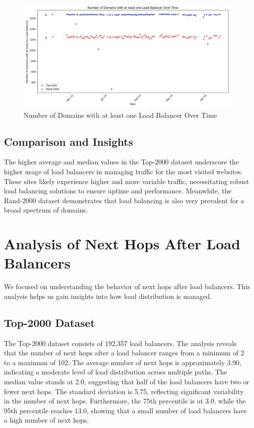 \documentclass[12pt]{cwru_thesis}
\begin{document}
\begin{figure}[h]
    \centering
    \includegraphics[width=\textwidth]{figures/scatter_plot_domains.png}
    \caption{Number of Domains with at least one Load Balancer Over Time}
    \label{fig:scatter_plot_domains}
\end{figure}
\subsection{Comparison and Insights}


The higher average and median values in the Top-2000 dataset underscore the higher usage of load balancers in managing traffic for the most visited websites. These sites likely experience higher and more variable traffic, necessitating robust load balancing solutions to ensure uptime and performance. Meanwhile, the Rand-2000 dataset demonstrates that load balancing is also very prevalent for a broad spectrum of domains.





\section{Analysis of Next Hops After Load Balancers}

We focused on understanding the behavior of next hops after load balancers. This analysis helps us gain insights into how load distribution is managed.


\subsection{Top-2000 Dataset}
The Top-2000 dataset consists of 192,357 load balancers. The analysis reveals that the number of next hops after a load balancer ranges from a minimum of 2 to a maximum of 102. The average number of next hops is approximately 3.90, indicating a moderate level of load distribution across multiple paths. The median value stands at 2.0, suggesting that half of the load balancers have two or fewer next hops. The standard deviation is 5.75, reflecting significant variability in the number of next hops. Furthermore, the 75th percentile is at 3.0, while the 95th percentile reaches 13.0, showing that a small number of load balancers have a high number of next hops.
\end{document}
